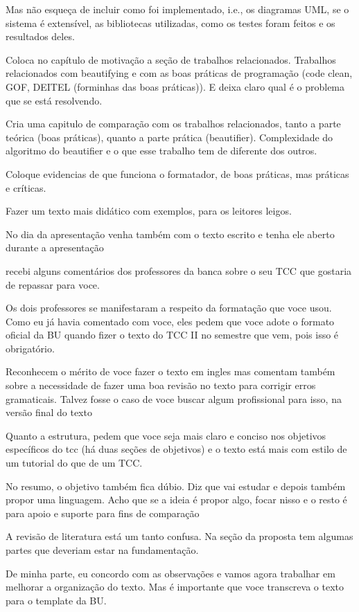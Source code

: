Mas não esqueça de incluir como foi implementado, i.e., os diagramas UML, se
o sistema é extensível, as bibliotecas utilizadas, como os testes foram
feitos e os resultados deles.

Coloca no capítulo de motivação a seção de trabalhos relacionados. Trabalhos
relacionados com beautifying e com as boas práticas de programação (code clean,
GOF, DEITEL (forminhas das boas práticas)). E deixa claro qual é o problema
que se está resolvendo.

Cria uma capitulo de comparação com os trabalhos relacionados, tanto a parte
teórica (boas práticas), quanto a parte prática (beautifier). Complexidade do
algoritmo do beautifier e o que esse trabalho tem de diferente dos outros.

Coloque evidencias de que funciona o formatador, de boas práticas, mas
práticas e críticas.

Fazer um texto mais didático com exemplos, para os leitores leigos.

No dia da apresentação venha também com o texto escrito e tenha ele aberto durante a apresentação


recebi alguns comentários dos professores da banca sobre o seu TCC que
gostaria de repassar para voce.

Os dois professores se manifestaram a respeito da formatação que voce
usou. Como eu já havia comentado com voce, eles pedem que voce adote o
formato oficial da BU quando fizer o texto do TCC II no semestre que
vem, pois isso é obrigatório.

Reconhecem o mérito de voce fazer o texto em ingles mas comentam
também sobre a necessidade de fazer uma boa revisão no texto para
corrigir erros gramaticais. Talvez fosse o caso de voce buscar algum
profissional para isso, na versão final do texto

Quanto a estrutura, pedem que voce seja mais claro e conciso nos
objetivos específicos do tcc (há duas seções de objetivos) e o texto
está mais com estilo de um tutorial do que de um TCC.

No resumo, o objetivo também fica dúbio. Diz que vai estudar e depois
também propor uma linguagem. Acho que se a ideia é propor algo, focar
nisso e o resto é para apoio e suporte para fins de comparação

A revisão de literatura está um tanto confusa. Na seção da proposta
tem algumas partes que deveriam estar na fundamentação.

De minha parte, eu concordo com as observações e vamos agora trabalhar
em melhorar a organização do texto. Mas é importante que voce
transcreva o texto para o template da BU.


